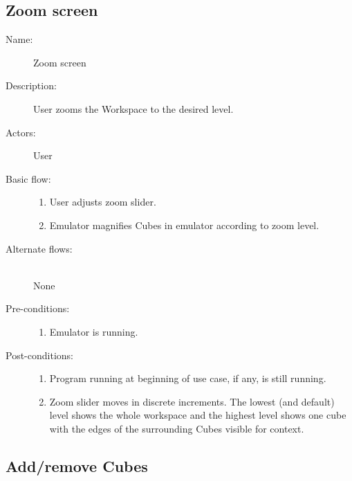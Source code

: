 \documentclass[12pt]{article}
\begin{document}
  \subsection{Zoom screen}

    \begin{description}
      \item[Name:] Zoom screen
      \item[Description:] User zooms the Workspace to the desired level.
      \item[Actors:] User
      \item[Basic flow:] \hfill
        \begin{enumerate}
	  \item{User adjusts zoom slider.}
	  \item{Emulator magnifies Cubes in emulator according to zoom level.}
        \end{enumerate}
      \item[Alternate flows:] \hfill \\
	None
      \item[Pre-conditions:] \hfill
        \begin{enumerate}
          \item{Emulator is running.}
        \end{enumerate}
      \item[Post-conditions:] \hfill
        \begin{enumerate}
	  \item{Program running at beginning of use case, if any, is still running.}
	  \item{Zoom slider moves in discrete increments. The lowest (and default) level shows the whole workspace and the highest level shows one cube with the edges of the surrounding Cubes visible for context.}
        \end{enumerate}
    \end{description}	

  \subsection{Add/remove Cubes}
\end{document}
